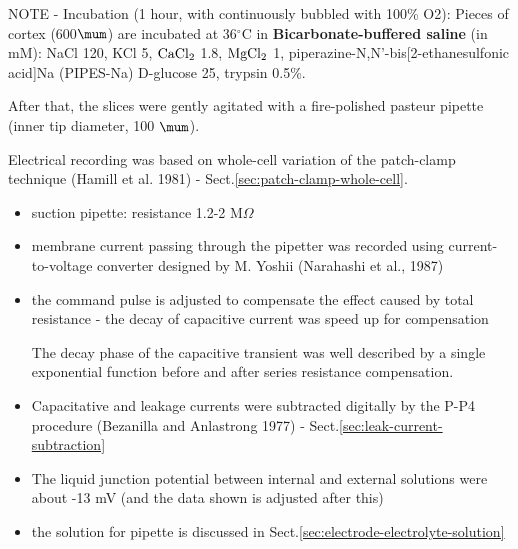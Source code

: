 NOTE - Incubation (1 hour, with continuously bubbled with 100\% O2): Pieces of
cortex (600$\mum$) are incubated at 36$^\circ$C in {\bf Bicarbonate-buffered saline} (in mM):
NaCl 120, KCl 5, $\ce{CaCl_2}$  1.8, $\ce{MgCl_2}$ 1, 
piperazine-N,N'-bis[2-ethanesulfonic acid]Na (PIPES-Na)
D-glucose 25, trypsin 0.5\%.

After that, the slices were gently agitated with a fire-polished pasteur pipette
(inner tip diameter, 100 $\mum$).

Electrical recording was based on  whole-cell variation of
the patch-clamp technique (Hamill et al. 1981) -
Sect.\ref{sec:patch-clamp-whole-cell}.
\begin{itemize}
  \item suction pipette: resistance 1.2-2 M$\Omega$
  
  \item membrane current passing through the pipetter was recorded using
  current-to-voltage converter designed by M. Yoshii (Narahashi et al., 1987)
  
  \item the command pulse is adjusted to compensate the effect caused by total
  resistance - the decay of capacitive current was speed up for compensation
  
  The decay phase of the capacitive transient was
well described by a single exponential function before and after series
resistance compensation.
  
  \item Capacitative and leakage currents were subtracted digitally by the P-P4
  procedure (Bezanilla and Anlastrong 1977) - Sect.\ref{sec:leak-current-subtraction}

  \item The liquid junction potential between internal and external solutions
  were about -13 mV (and the data shown is adjusted after this)
  
  \item the solution for pipette is discussed in Sect.\ref{sec:electrode-electrolyte-solution}
\end{itemize}


